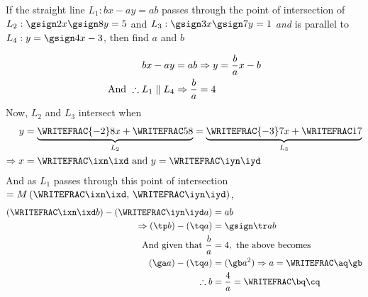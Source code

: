 \FRACMINUS\vbfour\vbfive\vbone\vbtwo\tp\tq
\FRACMINUS\vbsix\vbfive\vbthree\vbtwo\tr\ts
\FRACDIV\tr\ts\tp\tq\ixn\ixd %
\FRACL{-\vbone}{\vbthree}\ixn\ixd\iyn\iyd
\FRACDIV\iyn\iyd{}\iyn\iyd
\MULTIPLY\ixn\iyd\tp
\MULTIPLY{\ixd}\iyn\tq
\MULTIPLY\ixd\iyd\tr
\MULTIPLY\vbseven\tp\ga
\MULTIPLY\tr\vbseven\gb
\SUBTRACT\ga\tq\aq
\FRACDIV{}\aq\gb\bq\cq


\question[2] If the straight line $L_1: bx - ay = ab$ passes through the point of intersection of 
$L_2: \gsign\vbone x \gsign\vbtwo y = \vbthree$ and $L_3: \gsign\vbfour x \gsign\vbfive y = \vbsix$ 
\textit{and} is parallel to $L_4: y = \gsign\vbseven x - \vbeight$, then find $a$ and $b$


\watchout

\ifprintanswers
\fi 

\begin{solution}[\halfpage]
	\begin{align}
		bx - ay &= ab \Rightarrow y = \dfrac{b}{a}x -b \\
		\text{And }\therefore L_1 \parallel L_4 &\Rightarrow \dfrac{b}{a} = 4 
	\end{align}
	Now, $L_2$ and $L_3$ intersect when 
	\begin{align}
		y &= \underbrace{\WRITEFRAC{-\vbone}\vbtwo x  + \WRITEFRAC\vbthree\vbtwo}_{L_2} 
		 = \underbrace{\WRITEFRAC{-\vbfour}\vbfive x + \WRITEFRAC\vbsix\vbfive}_{L_3} \\
		 \Rightarrow x &= \WRITEFRAC\ixn\ixd \text{ and } y = \WRITEFRAC\iyn\iyd
	\end{align}
	And as $L_1$ passes through this point of intersection 
	$ = M\left( \WRITEFRAC\ixn\ixd,\,\WRITEFRAC\iyn\iyd\right)$, 
	\begin{align}
		\left(\WRITEFRAC\ixn\ixd b\right) - \left( \WRITEFRAC\iyn\iyd a \right)&= ab \\
		\Rightarrow (\tp b) - (\tq a) &= \gsign\tr ab \\
		\text{And given that } \dfrac{b}{a} &= \vbseven, \text{ the above becomes } \\
		(\ga a) - (\tq a) &= (\gb a^2) \Rightarrow a = \WRITEFRAC\aq\gb \\
		\therefore b &= \frac{\vbseven}{a} = \WRITEFRAC\bq\cq
	\end{align}
\end{solution}

